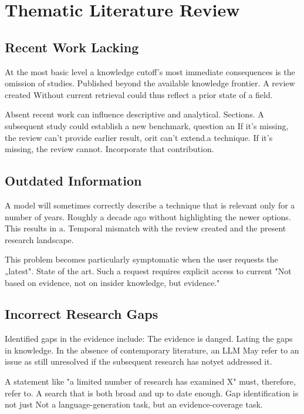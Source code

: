 \documentclass[acmsmall,screen]{acmart}
\begin{document}
\section {Thematic Literature Review}

\subsection{Recent Work Lacking}

At the most basic level a knowledge cutoff's most immediate consequences is the omission of studies.
Published beyond the available knowledge frontier. A review created
Without current retrieval could thus reflect a prior state of a
field.

Absent recent work can influence descriptive and analytical.
Sections. A subsequent study could establish a new benchmark, question an
If it's missing, the review can't provide earlier result, orit can't extend.a technique. If it's missing, the review cannot.
Incorporate that contribution.

\subsection{Outdated Information}

A model will sometimes correctly describe a technique that is relevant only for a number of years.
Roughly a decade ago without highlighting the newer options. This results in a.
Temporal mismatch with the review created and the present
research landscape.

This problem becomes particularly symptomatic when the user requests the „latest".
State of the art. Such a request requires explicit access to current
"Not based on evidence, not on insider knowledge, but evidence."

\subsection{Incorrect Research Gaps}

Identified gaps in the evidence include: The evidence is danged.
Lating the gaps in knowledge. In the absence of contemporary literature, an LLM
May refer to an issue as still unresolved if the subsequent research has notyet 
addressed it.

A statement like "a limited number of research has examined X" must, therefore, refer to.
A search that is both broad and up to date enough. Gap identification is not just
Not a language-generation task, but an evidence-coverage task.
\end{document}
